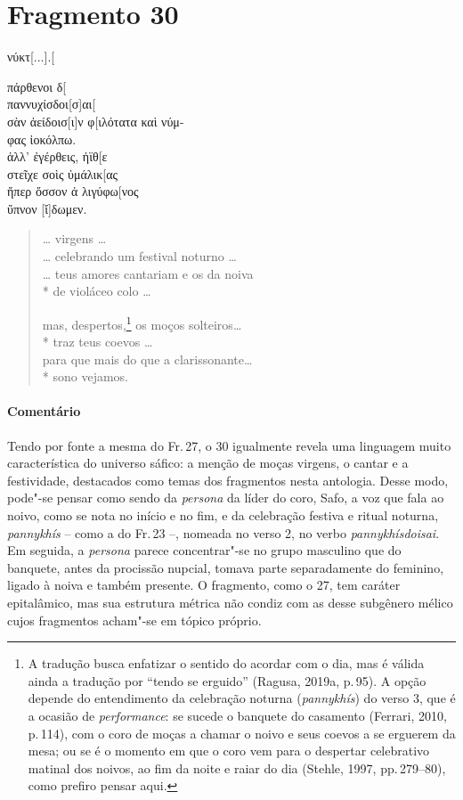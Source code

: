 {\pagebreak
\section{Fragmento 30}

\begin{gkverse}
νύκτ[...].[

πάρθενοι δ[\\
παννυχίσδοι[σ]αι[\\
σὰν ἀείδοισ[ι]ν φ[ιλότατα καὶ νύμ-\\
φας ἰοκόλπω.\\
ἀλλ’ ἐγέρθεις, ἠϊθ[ε\\
στεῖχε σοὶς ὐμάλικ[ας\\
ἤπερ ὄσσον ἀ λιγύφω[νος\\
ὔπνον [ἴ]δωμεν.
\end{gkverse}

\begin{verse}
\ldots{} virgens \ldots{}\\
\ldots{} celebrando um festival noturno \ldots{}\\
\ldots{} teus amores cantariam e os da noiva\\*
de violáceo colo \ldots{}

mas, despertos,\footnote{A tradução busca enfatizar o sentido do acordar com o dia, mas é válida ainda a tradução por ``tendo se erguido'' (Ragusa, 2019a, p.\,95). A opção depende do entendimento da celebração noturna (\textit{pannykhís}) do verso 3, que é a ocasião de \textit{performance}:  se sucede o banquete do casamento (Ferrari, 2010, p.\,114), com o coro de moças a chamar o noivo e seus coevos a se erguerem da mesa; ou se é o momento em que o coro vem para o despertar celebrativo matinal dos noivos, ao fim da noite e raiar do dia (Stehle, 1997, pp.\,279--80), como prefiro pensar aqui.} os moços solteiros\ldots{}\\*
traz teus coevos \ldots{}\\
para que mais do que a clarissonante\ldots{}\\*
sono vejamos.
\end{verse}
\pagebreak
{\paragraph{Comentário} Tendo por fonte a mesma do Fr.\,27, o 30 igualmente revela uma linguagem muito característica do universo sáfico: a menção de moças virgens, o cantar e a festividade, destacados como temas dos fragmentos nesta antologia. Desse modo, pode"-se pensar como sendo da \textit{persona} da líder do coro, Safo, a
voz que fala ao noivo, como se nota no início e no fim, e da celebração
festiva e ritual noturna, \textit{pannykhís} -- como a do Fr.\,23 --, nomeada no verso 2, no verbo \textit{pannykhísdoisai}. Em seguida, a \textit{persona} parece concentrar"-se no grupo masculino que do
banquete, antes da procissão nupcial, tomava parte separadamente do feminino,
ligado à noiva e também presente. O fragmento, como o 27, tem caráter
epitalâmico, mas sua estrutura métrica não condiz com as desse subgênero
mélico cujos fragmentos acham"-se em tópico próprio.}

}
